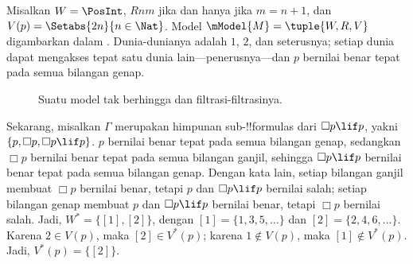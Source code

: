 \documentclass[../../../include/open-logic-section]{subfiles}
\begin{document}
\begin{ex}
  Misalkan $W = \PosInt$, $Rnm$ jika dan hanya jika $m = n + 1$, dan
  $V(p) = \Setabs{2n}{n \in \Nat}$. Model
  $\mModel{M} = \tuple{W, R, V}$ digambarkan dalam
  . Dunia-dunianya adalah $1$, $2$, dan seterusnya;
  setiap dunia dapat mengakses tepat satu dunia lain---penerusnya---dan $p$
  bernilai benar tepat pada semua bilangan genap.

  \begin{figure}
    \centering

    \caption{Suatu model tak berhingga dan filtrasi-filtrasinya.}
  \end{figure}

  Sekarang, misalkan $\Gamma$ merupakan himpunan sub-!!{formula}s dari
  $\Box p \lif p$, yakni $\{p, \Box p, \Box p \lif p\}$. $p$ bernilai benar
  tepat pada semua bilangan genap, sedangkan $\Box p$ bernilai benar tepat
  pada semua bilangan ganjil, sehingga $\Box p \lif p$ bernilai benar tepat
  pada semua bilangan genap. Dengan kata lain, setiap bilangan ganjil membuat
  $\Box p$ bernilai benar, tetapi $p$ dan $\Box p \lif p$ bernilai salah;
  setiap bilangan genap membuat $p$ dan $\Box p \lif p$ bernilai benar,
  tetapi $\Box p$ bernilai salah. Jadi, $W^* = \{ [1], [2] \}$, dengan
  $[1] = \{1, 3, 5, \dots\}$ dan $[2] = \{2, 4, 6, \dots\}$. Karena
  $2 \in V(p)$, maka $[2] \in V^*(p)$; karena $1 \notin V(p)$, maka
  $[1] \notin V^*(p)$. Jadi, $V^*(p) = \{[2]\}$.


\end{ex}
\end{document}
